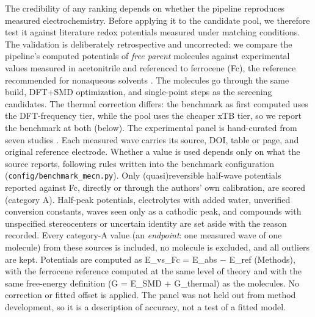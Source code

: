 \documentclass[journal=jcisd8,manuscript=article]{achemso}
\begin{document}
The credibility of any ranking depends on whether the pipeline reproduces measured electrochemistry. Before applying it to the candidate pool, we therefore test it against literature redox potentials measured under matching conditions. The validation is deliberately retrospective and uncorrected: we compare the pipeline's computed potentials of \emph{free parent} molecules against experimental values measured in acetonitrile and referenced to ferrocene (Fc), the reference recommended for nonaqueous solvents \cite{gritzner1984}. The molecules go through the same build, DFT+SMD optimization, and single-point steps as the screening candidates. The thermal correction differs: the benchmark as first computed uses the DFT-frequency tier, while the pool uses the cheaper xTB tier, so we report the benchmark at both (below). The experimental panel is hand-curated from seven studies \cite{huynh2016,wang2020,cabral2023,kim2022,daub2021,attanayake2019,gerken2015}. Each measured wave carries its source, DOI, table or page, and original reference electrode. Whether a value is used depends only on what the source reports, following rules written into the benchmark configuration (\texttt{config/benchmark\_mecn.py}). Only (quasi)reversible half-wave potentials reported against Fc, directly or through the authors' own calibration, are scored (category A). Half-peak potentials, electrolytes with added water, unverified conversion constants, waves seen only as a cathodic peak, and compounds with unspecified stereocenters or uncertain identity are set aside with the reason recorded. Every category-A value (an \emph{endpoint}: one measured wave of one molecule) from these sources is included, no molecule is excluded, and all outliers are kept. Potentials are computed as E\_vs\_Fc = E\_abs − E\_ref (Methods), with the ferrocene reference computed at the same level of theory and with the same free-energy definition (G = E\_SMD + G\_thermal) as the molecules. No correction or fitted offset is applied. The panel was not held out from method development, so it is a description of accuracy, not a test of a fitted model.
\end{document}
